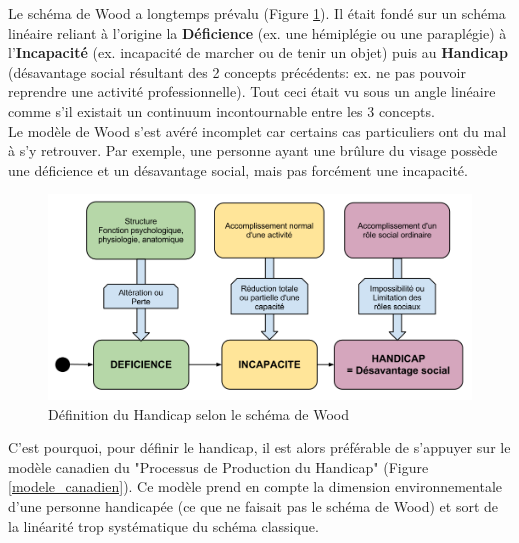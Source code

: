 Le schéma de Wood a longtemps prévalu (Figure \ref{schema_wood}). Il était fondé sur un schéma linéaire reliant à l'origine la \textbf{Déficience} (ex. une hémiplégie ou une paraplégie) à l'\textbf{Incapacité} (ex. incapacité de marcher ou de tenir un objet) puis au \textbf{Handicap} (désavantage social résultant des 2 concepts précédents: ex. ne pas pouvoir reprendre une activité professionnelle). Tout ceci était vu sous un angle linéaire comme s'il existait un continuum incontournable entre les 3 concepts. \\

Le modèle de Wood s'est avéré incomplet car certains cas particuliers ont du mal à s'y retrouver. Par exemple, une personne ayant une brûlure du visage possède une déficience et un désavantage social, mais pas forcément une incapacité.\\

\begin{figure}
\centering
\includegraphics[scale=0.45]{figures/schema_wood.png}
\caption{Définition du Handicap selon le schéma de Wood}
\label{schema_wood}
\end{figure}

C'est pourquoi, pour définir le handicap, il est alors préférable de s'appuyer sur le modèle canadien du "Processus de Production du Handicap" (Figure \ref{modele_canadien}). Ce modèle prend en compte la dimension environnementale d'une personne handicapée (ce que ne faisait pas le schéma de Wood) et sort de la linéarité trop systématique du schéma classique.~\cite{pphFougeyrollas}~\cite{socialConsequences}


